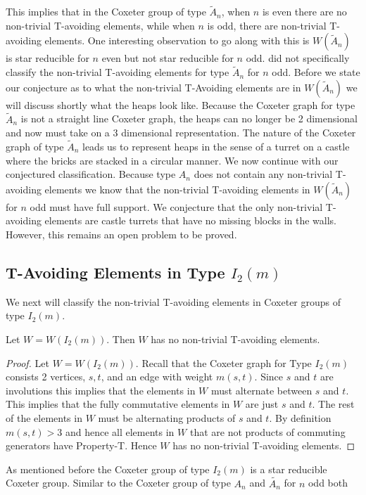 This implies that in the Coxeter group of type $\widetilde{A}_n$, when $n$ is even there are no non-trivial T-avoiding elements, while when $n$ is odd, there are non-trivial T-avoiding elements. One interesting observation to go along with this is $W(\widetilde{A}_n)$ is star reducible for $n$ even but not star reducible for $n$ odd. \cite{Fan1999} did not specifically classify the non-trivial T-avoiding elements for type $\widetilde{A}_n$ for $n$ odd. Before we state our conjecture as to what the non-trivial T-Avoiding elements are in $W(\widetilde{A}_n)$ we will discuss shortly what the heaps look like. Because the Coxeter graph for type $\widetilde{A}_n$ is not a straight line Coxeter graph, the heaps can no longer be 2 dimensional and now must take on a 3 dimensional representation. The nature of the Coxeter graph of type $\widetilde{A}_n$ leads us to represent heaps in the sense of a turret on a castle where the bricks are stacked in a circular manner. We now continue with our conjectured classification. Because type $A_n$ does not contain any non-trivial T-avoiding elements we know that the non-trivial T-avoiding elements in $W(\widetilde{A}_n)$ for $n$ odd must have full support. We conjecture that the only non-trivial T-avoiding elements are castle turrets that have no missing blocks in the walls. However, this remains an open problem to be proved.


\subsection{T-Avoiding Elements in Type $I_2(m)$}

We next will classify the non-trivial T-avoiding elements in Coxeter groups of type $I_2(m)$. 
\begin{theorem}
Let $W=W(I_2(m))$. Then $W$ has no non-trivial T-avoiding elements.
\begin{proof}
	Let $W=W(I_2(m))$. Recall that the Coxeter graph for Type $I_2(m)$ consists 2 vertices, $s,t$, and an edge with weight $m(s,t)$. Since $s$ and $t$ are involutions this implies that the elements in $W$ must alternate between $s$ and $t$. This implies that the fully commutative elements in $W$ are just $s$ and $t$. The rest of the elements in $W$ must be alternating products of $s$ and $t$. By definition $m(s,t)>3$ and hence all elements in $W$ that are not products of commuting generators have Property-T. Hence $W$ has no non-trivial T-avoiding elements. 
\end{proof}	
\end{theorem}
 
As mentioned before the Coxeter group of type $I_2(m)$ is a star reducible Coxeter group. Similar to the Coxeter group of type $A_n$ and $\widetilde{A_n}$ for $n$ odd both
